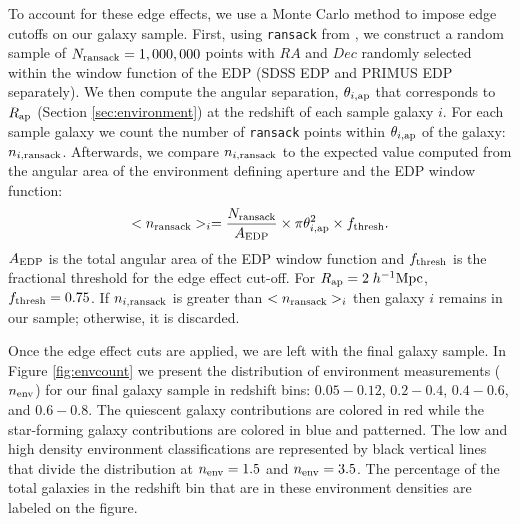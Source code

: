 \documentclass{emulateapj}
\begin{document}
To account for these edge effects, we use a Monte Carlo method to impose edge cutoffs on our galaxy sample. First, using \texttt{ransack} from \cite{Swanson:2008aa}, we construct a random sample of  $N_{\rm{ransack}} = 1,000,000$ points with $RA$ and $Dec$ randomly selected within the window function of the EDP (SDSS EDP and PRIMUS EDP separately). We then compute the angular separation, $\theta_{i, \rm{ap}}$ that corresponds to $R_{\rm{ap}}$ (Section \ref{sec:environment}) at the redshift of each sample galaxy $i$. For each sample galaxy we count the number of \texttt{ransack} points within $\theta_{i, \rm{ap}}$ of the galaxy: $n_{i,\rm{ransack}}$. Afterwards, we compare $n_{i,\rm{ransack}}$ to the expected value computed from the angular area of the environment defining aperture and the EDP window function: 
\begin{equation} \label{eq:ransack}
<n_{\rm{ransack}}>_{i} = \frac{N_{\rm{ransack}}}{A_{\rm{EDP}}}\times {\pi \theta_{i, \rm{ap}}^2} \times f_{\rm{thresh}}. 
\end{equation} 
$A_{\rm{EDP}}$ is the total angular area of the EDP window function and $f_{\rm{thresh}}$ is the fractional threshold for the edge effect cut-off. For $R_{\rm{ap}}= 2\;h^{-1} \rm{Mpc}$, $f_{\rm{thresh}} = 0.75$. If $n_{i, \rm{ransack}}$ is greater than $<n_{\rm{ransack}}>_i$ then galaxy $i$ remains in our sample; otherwise, it is discarded. 

Once the edge effect cuts are applied, we are left with the final galaxy sample. In Figure \ref{fig:envcount} we present the distribution of environment measurements ($n_{\rm{env}}$) for our final galaxy sample in redshift bins: $0.05 - 0.12$, $0.2 - 0.4$, $0.4-0.6$, and $0.6-0.8$. The quiescent galaxy contributions are colored in red while the star-forming galaxy contributions are colored in blue and patterned. The low and high density environment classifications are represented by black vertical lines that divide the distribution at $n_{\rm{env}} = 1.5$ and $n_{\rm{env}} = 3.5$. The percentage of the total galaxies in the redshift bin that are in these environment densities are labeled on the figure. 
\end{document}
